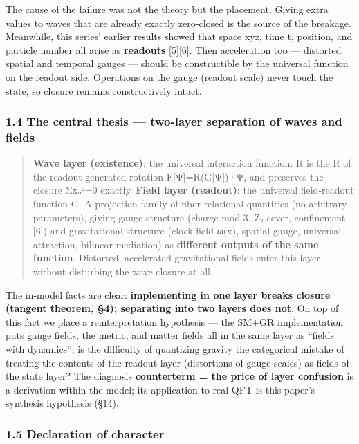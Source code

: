 \documentclass[
]{article}
\begin{document}
The cause of the failure was not the theory but the placement. Giving
extra values to waves that are already exactly zero-closed is the source
of the breakage. Meanwhile, this series' earlier results showed that
space xyz, time t, position, and particle number all arise as
\textbf{readouts} {[}5{]}{[}6{]}. Then acceleration too --- distorted
spatial and temporal gauges --- should be constructible by the universal
function on the readout side. Operations on the gauge (readout scale)
never touch the state, so closure remains constructively intact.

\subsubsection{1.4 The central thesis --- two-layer separation of waves
and
fields}\label{the-central-thesis-two-layer-separation-of-waves-and-fields}

\begin{quote}
\textbf{Wave layer (existence)}: the universal interaction function. It
is the R of the readout-generated rotation F{[}Ψ{]}=R(G{[}Ψ{]})·Ψ, and
preserves the closure Σxₙ²=0 exactly. \textbf{Field layer (readout)}:
the universal field-readout function G. A projection family of fiber
relational quantities (no arbitrary parameters), giving gauge structure
(charge mod 3, Z₂ cover, confinement {[}6{]}) and gravitational
structure (clock field ω(x), spatial gauge, universal attraction,
bilinear mediation) as \textbf{different outputs of the same function}.
Distorted, accelerated gravitational fields enter this layer without
disturbing the wave closure at all.
\end{quote}

The in-model facts are clear: \textbf{implementing in one layer breaks
closure (tangent theorem, §4); separating into two layers does not}. On
top of this fact we place a reinterpretation hypothesis --- the SM+GR
implementation puts gauge fields, the metric, and matter fields all in
the same layer as ``fields with dynamics''; is the difficulty of
quantizing gravity the categorical mistake of treating the contents of
the readout layer (distortions of gauge scales) as fields of the state
layer? The diagnosis \textbf{counterterm = the price of layer confusion}
is a derivation within the model; its application to real QFT is this
paper's synthesis hypothesis (§14).

\subsubsection{1.5 Declaration of
character}\label{declaration-of-character}
\end{document}
